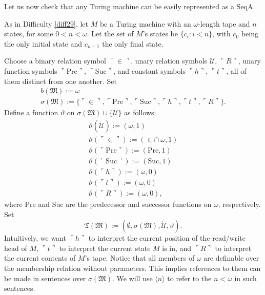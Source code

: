\documentclass[12pt]{article}
\numberwithin{equation}{section}
\begin{document}
Let us now check that any Turing machine can be easily represented as a SeqA.

\begin{ex}\label{ex212}
As in Difficulty \ref{diff29}, let $M$ be a Turing machine with an $\omega$-length tape and $n$ states, for some $0 < n < \omega$. Let the set of $M$'s states be $\{c_i : i < n\}$, with $c_0$ being the only initial state and $c_{n-1}$ the only final state. 

Choose a binary relation symbol $\ulcorner \in \urcorner$, unary relation symbols $\dot{\mathcal{U}}$, $\ulcorner R \urcorner$, unary function symbols $\ulcorner \mathrm{Pre} \urcorner$, $\ulcorner \mathrm{Suc} \urcorner$, and constant symbols $\ulcorner h \urcorner$, $\ulcorner t \urcorner$, all of them distinct from one another. Set 
\begin{gather*}
    b(\mathfrak{M}) := \omega \\
    \sigma(\mathfrak{M}) := \{\ulcorner \in \urcorner, \ulcorner \mathrm{Pre} \urcorner, \ulcorner \mathrm{Suc} \urcorner, \ulcorner h \urcorner, \ulcorner t \urcorner, \ulcorner R \urcorner\} \text{.}
\end{gather*}
Define a function $\vartheta$ on $\sigma(\mathfrak{M}) \cup \{\dot{\mathcal{U}}\}$ as follows:
\begin{gather*}
    \vartheta(\dot{\mathcal{U}}) := (\omega, 1) \\
    \vartheta(\ulcorner \in \urcorner) := (\in \cap \ \omega, 1) \\
    \vartheta(\ulcorner \mathrm{Pre} \urcorner) := (\mathrm{Pre}, 1) \\
    \vartheta(\ulcorner \mathrm{Suc} \urcorner) := (\mathrm{Suc}, 1) \\
    \vartheta(\ulcorner h \urcorner) := (\omega, 0) \\
    \vartheta(\ulcorner t \urcorner) := (\omega, 0) \\
    \vartheta(\ulcorner R \urcorner) := (\omega, 0) \text{,}
\end{gather*}
where $\mathrm{Pre}$ and $\mathrm{Suc}$ are the predecessor and successor functions on $\omega$, respectively. Set
\begin{equation*}
    \mathfrak{T}(\mathfrak{M}) := (\emptyset, \sigma(\mathfrak{M}), \dot{\mathcal{U}}, \vartheta) \text{.}
\end{equation*}
Intuitively, we want $\ulcorner h \urcorner$ to interpret the current position of the read/write head of $M$, $\ulcorner t \urcorner$ to interpret the current state $M$ is in, and $\ulcorner R \urcorner$ to interpret the current contents of $M$'s tape. Notice that all members of $\omega$ are definable over the membership  relation without parameters. This implies references to them can be made in sentences over $\sigma(\mathfrak{M})$. We will use $\langle n \rangle$ to refer to the $n < \omega$ in such sentences. 


\end{ex}
\end{document}
